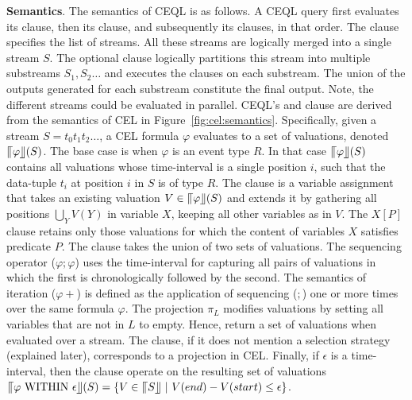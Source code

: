 \textbf{Semantics}. The semantics of CEQL is as follows. A CEQL query first evaluates its  clause, then its  clause, and subsequently its  clauses, in that order. The  clause specifies the list of streams. All these streams are logically merged into a single stream $S$. The optional  clause logically partitions this stream into multiple substreams $S_{1}, S_{2}\ldots$ and executes the  clauses on each substream. The union of the outputs generated for each substream constitute the final output. Note, the different streams could be evaluated in parallel. CEQL's  and  clause are derived from the semantics of CEL in Figure~\ref{fig:cel:semantics}. Specifically, given a stream $S = t_{0}t_{1}t_{2} \ldots $, a CEL formula $\varphi$ evaluates to a set of valuations, denoted $\llceil \varphi \rrfloor(S)$. The base case is when $\varphi$ is an event type $R$. In that case $\llceil \varphi \rrfloor(S)$ contains all valuations whose time-interval is a single position $i$, such that the data-tuple $t_{i}$ at position $i$ in $S$ is of type $R$. The  clause is a variable assignment that takes an existing valuation $V \in \llceil \varphi \rrfloor(S)$ and extends it by gathering all positions $\bigcup_{Y}V(Y)$ in variable $X$, keeping all other variables as in $V$. The  $X[P]$ clause retains only those valuations for which the content of variables $X$ satisfies predicate $P$. The  clause takes the union of two sets of valuations. The sequencing operator ($\varphi;\varphi$) uses the time-interval for capturing all pairs of valuations in which the first is chronologically followed by the second. The semantics of iteration ($\varphi+$) is defined as the application of sequencing ($;$) one or more times over the same formula $\varphi$. The projection $\pi_{L}$ modifies valuations by setting all variables that are not in $L$ to empty. Hence,  return a set of valuations when evaluated over a stream. The  clause, if it does not mention a selection strategy (explained later), corresponds to a projection in CEL. Finally, if $\epsilon$ is a time-interval, then the  clause operate on the resulting set of valuations $\InSBrackets{\varphi \ \text{WITHIN} \ \epsilon}(S) = \{ V \in \InSBrackets{S} \ | \ V(end) - V(start) \le \epsilon \}$.

